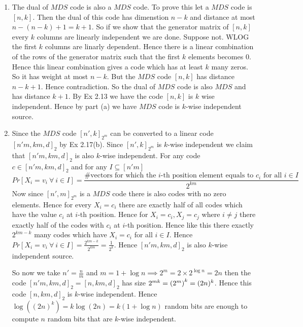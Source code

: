 \documentclass[a4paper, 11pt]{article}
\begin{document}
{\begin{enumerate}
		Now since there is a vector which has nonzero element at every positon if we take any vector randomly then for any random position all alphabets can be present in that position. Because since there is a code in $C$ which has nonzero element at every positon for any position if we multiply the element in that position with all the elements of $\bbF_q$ then it goes through all the elements of $\bbF_q$. So for any random vector and any random position the alphabet $Pr[X=\alpha]=\frac{1}{q}$, $\alpha\in\bbF_q$. Hence any cpde $[n,k]_q$ is 1-wise independent source.
		\item The dual of $MDS$ code is also a $MDS$ code. To prove this let a $MDS$ code is $[n,k]$. Then the dual of this code has dimenstion $n-k$ and distance at most $n-(n-k)+1=k+1$. So if we show that the generator matrix of $[n,k]$ every $k$ columns are linearly independent we are done. Suppose not. WLOG the first $k$ columns are linarly dependent. Hence there is a linear combination of the rows of the generator matrix such that the first $k$ elements becomes 0. Hence this linear combination gives a code which has at least $k$ many zeros. So it has weight at most $n-k$. But the $MDS$ code $[n,k]$ has distance $n-k+1$. Hence contradiction. So the dual of $MDS$ code is also $MDS$ and has distance $k+1$. By Ex 2.13 we have the code $[n,k]$ is $k$ wise independent. Hence by part (a) we have $MDS$ code is $k$-wise independent source.
	
		
		\item Since the $MDS$ code $[n',k]_{2^m}$ can be converted to a linear code $[n'm,km,d]_2$ by Ex 2.17(b). Since $[n',k]_{2^m}$ is $k$-wise independent we claim that $[n'm,km,d]_2$ is also $k$-wise independent. For any code $c\in [n'm,km,d]_2$ and for any $I\subseteq [n'm]$  $$Pr[X_i=v_i\ \forall \ i\in I]=\frac{\#\text{vectors for which the $i$-th position element equals to $c_i$ for all $i\in I$}}{2^{km}}$$ Now since $[n',m]_{2^m}$ is a $MDS$ code there is also codes with no zero elements. Hence for every $X_i=c_i$ there are exactly half of all codes which have the value $c_i$ at $i$-th position. Hence for $X_i=c_i, X_j=c_j$ where $i\neq j$ there exactly half of the codes with $c_i$ at $i$-th position. Hence like this there exactly $2^{km-k} $ many codes which have $X_i=c_i$ for all $i\in I$. Hence $Pr[X_i=v_i\ \forall \ i\in I]=\frac{2^{km-k}}{2^{km}}=\frac{1}{2^k}$. Hence $[n'm,km,d]_2$ is also $k$-wise independent source. \parinn
		
		So now we take $n'=\frac{n}{m}$ and $m=1+\log n\implies 2^m=2\times 2^{\log n}=2n$ then the code $[n'm,km,d]_2=[n,km,d]_2$ has size  $2^{mk}=\left(2^m\right)^k=(2n)^k$. Hence this code $[n,km,d]_2$ is $k$-wise independent. Hence $\log((2n)^k)=k\log (2n)=k(1+\log n)$ random bits are enough to compute $n$ random bits that are $k$-wise independent.
		

\end{enumerate}}
\end{document}
